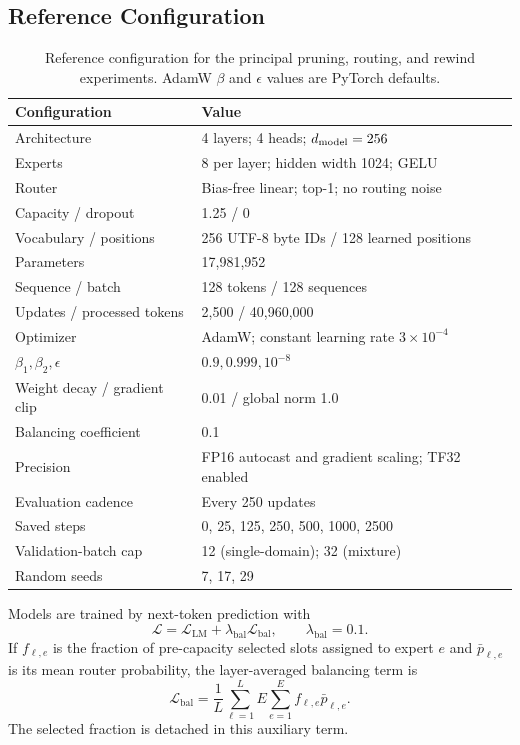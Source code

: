 \documentclass{article}
\begin{document}
\subsection{Reference Configuration}

\begin{table}[t]
\centering
\scriptsize
\caption{Reference configuration for the principal pruning, routing, and
rewind experiments. AdamW $\beta$ and $\epsilon$ values are PyTorch defaults.}
\label{tab:app_reference_configuration}
\begin{tabular}{@{}ll@{}}
\toprule
Configuration & Value \\
\midrule
Architecture & 4 layers; 4 heads; $d_{\rm model}=256$ \\
Experts & 8 per layer; hidden width 1024; GELU \\
Router & Bias-free linear; top-1; no routing noise \\
Capacity / dropout & 1.25 / 0 \\
Vocabulary / positions & 256 UTF-8 byte IDs / 128 learned positions \\
Parameters & 17,981,952 \\
Sequence / batch & 128 tokens / 128 sequences \\
Updates / processed tokens & 2,500 / 40,960,000 \\
Optimizer & AdamW; constant learning rate $3\times10^{-4}$ \\
$\beta_1,\beta_2,\epsilon$ & $0.9,0.999,10^{-8}$ \\
Weight decay / gradient clip & 0.01 / global norm 1.0 \\
Balancing coefficient & 0.1 \\
Precision & FP16 autocast and gradient scaling; TF32 enabled \\
Evaluation cadence & Every 250 updates \\
Saved steps & 0, 25, 125, 250, 500, 1000, 2500 \\
Validation-batch cap & 12 (single-domain); 32 (mixture) \\
Random seeds & 7, 17, 29 \\
\bottomrule
\end{tabular}
\end{table}

Models are trained by next-token prediction with
\begin{equation}
\mathcal{L}
=
\mathcal{L}_{\mathrm{LM}}
+
\lambda_{\mathrm{bal}}\mathcal{L}_{\mathrm{bal}},
\qquad
\lambda_{\mathrm{bal}}=0.1.
\label{eq:app_training_objective}
\end{equation}
If $f_{\ell,e}$ is the fraction of pre-capacity selected slots assigned to
expert $e$ and $\bar p_{\ell,e}$ is its mean router probability, the
layer-averaged balancing term is
\begin{equation}
\mathcal{L}_{\mathrm{bal}}
=
\frac{1}{L}
\sum_{\ell=1}^{L}
E\sum_{e=1}^{E}
f_{\ell,e}\bar p_{\ell,e}.
\label{eq:app_balance}
\end{equation}
The selected fraction is detached in this auxiliary term.
\end{document}
